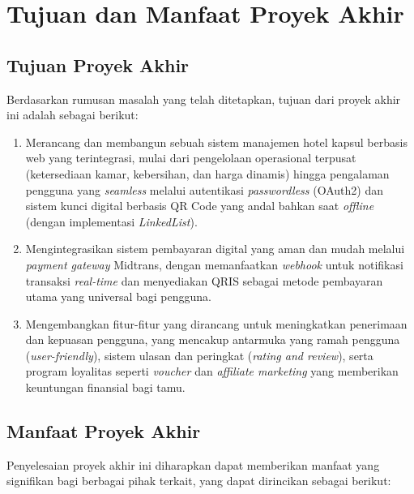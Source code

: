 \section{Tujuan dan Manfaat Proyek Akhir}

\subsection{Tujuan Proyek Akhir}
Berdasarkan rumusan masalah yang telah ditetapkan, tujuan dari proyek akhir ini adalah sebagai berikut:
\begin{enumerate}
    \item Merancang dan membangun sebuah sistem manajemen hotel kapsul berbasis web yang terintegrasi, mulai dari pengelolaan operasional terpusat (ketersediaan kamar, kebersihan, dan harga dinamis) hingga pengalaman pengguna yang \textit{seamless} melalui autentikasi \textit{passwordless} (OAuth2) dan sistem kunci digital berbasis QR Code yang andal bahkan saat \textit{offline} (dengan implementasi \textit{LinkedList}).
    \item Mengintegrasikan sistem pembayaran digital yang aman dan mudah melalui \textit{payment gateway} Midtrans, dengan memanfaatkan \textit{webhook} untuk notifikasi transaksi \textit{real-time} dan menyediakan QRIS sebagai metode pembayaran utama yang universal bagi pengguna.
    \item Mengembangkan fitur-fitur yang dirancang untuk meningkatkan penerimaan dan kepuasan pengguna, yang mencakup antarmuka yang ramah pengguna (\textit{user-friendly}), sistem ulasan dan peringkat (\textit{rating and review}), serta program loyalitas seperti \textit{voucher} dan \textit{affiliate marketing} yang memberikan keuntungan finansial bagi tamu.
\end{enumerate}

\subsection{Manfaat Proyek Akhir}
Penyelesaian proyek akhir ini diharapkan dapat memberikan manfaat yang signifikan bagi berbagai pihak terkait, yang dapat dirincikan sebagai berikut:

